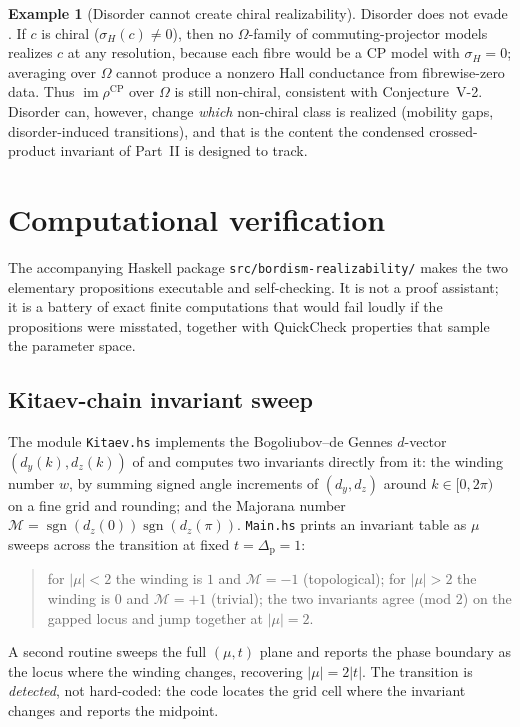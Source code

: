 \documentclass[12pt]{article}
\newcommand{\dis}{\Omega}                       %
\newcommand{\real}{\rho}                         %
\newcommand{\CP}{\mathrm{CP}}                    %
\newcommand{\Maj}{\mathcal{M}}                   %
\newcommand{\winding}{w}                         %
\newcommand{\im}{\operatorname{im}}
\DeclareMathOperator{\sgn}{sgn}
\theoremstyle{definition}
\newtheorem{example}[theorem]{Example}
\theoremstyle{remark}
\begin{document}
\begin{example}[Disorder cannot create chiral realizability]
\label{ex:disorderchiral}
Disorder does not evade . If $c$ is chiral ($\sigma_H(c)\ne0$), then no
$\dis$-family of commuting-projector models realizes $c$ at any resolution, because each
fibre would be a $\CP$ model with $\sigma_H=0$; averaging over $\dis$ cannot produce a
nonzero Hall conductance from fibrewise-zero data. Thus $\im\real^{\CP}$ over $\dis$ is still
non-chiral, consistent with Conjecture~V-2. Disorder can, however, change \emph{which}
non-chiral class is realized (mobility gaps, disorder-induced transitions), and that is the
content the condensed crossed-product invariant of Part~II \cite{prodan-sb} is designed to track.
\end{example}

\section{Computational verification}
\label{sec:haskell}

The accompanying Haskell package \texttt{src/bordism-realizability/} makes the two elementary
propositions executable and self-checking. It is not a proof assistant; it is a battery of
exact finite computations that would fail loudly if the propositions were misstated, together
with QuickCheck properties that sample the parameter space.

\subsection{Kitaev-chain invariant sweep}

The module \texttt{Kitaev.hs} implements the Bogoliubov--de Gennes $d$-vector
$(d_y(k),d_z(k))$ of  and computes two invariants directly from it: the
winding number $\winding$, by summing signed angle increments of $(d_y,d_z)$ around
$k\in[0,2\pi)$ on a fine grid and rounding; and the Majorana number
$\Maj=\sgn(d_z(0))\sgn(d_z(\pi))$. \texttt{Main.hs} prints an invariant table as $\mu$ sweeps
across the transition at fixed $t=\Delta_{\mathrm{p}}=1$:
\begin{quote}\small
for $|\mu|<2$ the winding is $1$ and $\Maj=-1$ (topological); for $|\mu|>2$ the winding is
$0$ and $\Maj=+1$ (trivial); the two invariants agree (mod $2$) on the gapped locus and jump
together at $|\mu|=2$.
\end{quote}
A second routine sweeps the full $(\mu,t)$ plane and reports the phase boundary as the locus
where the winding changes, recovering $|\mu|=2|t|$. The transition is \emph{detected}, not
hard-coded: the code locates the grid cell where the invariant changes and reports the
midpoint.
\end{document}
